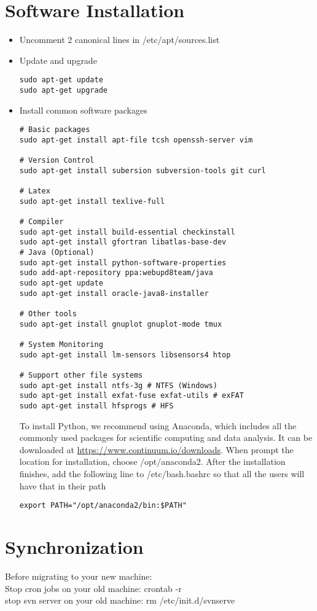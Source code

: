 \documentclass[12pt]{article}
\begin{document}
\section{Software Installation}
\begin{itemize}
\item Uncomment 2 canonical lines in /etc/apt/sources.list
\item Update and upgrade
\begin{Verbatim}
sudo apt-get update
sudo apt-get upgrade
\end{Verbatim}
\item Install common software packages
\begin{Verbatim}
# Basic packages
sudo apt-get install apt-file tcsh openssh-server vim

# Version Control
sudo apt-get install subersion subversion-tools git curl

# Latex
sudo apt-get install texlive-full

# Compiler
sudo apt-get install build-essential checkinstall
sudo apt-get install gfortran libatlas-base-dev
# Java (Optional)
sudo apt-get install python-software-properties
sudo add-apt-repository ppa:webupd8team/java
sudo apt-get update
sudo apt-get install oracle-java8-installer

# Other tools
sudo apt-get install gnuplot gnuplot-mode tmux

# System Monitoring
sudo apt-get install lm-sensors libsensors4 htop

# Support other file systems
sudo apt-get install ntfs-3g # NTFS (Windows)
sudo apt-get install exfat-fuse exfat-utils # exFAT
sudo apt-get install hfsprogs # HFS

\end{Verbatim}

To install Python, we recommend using Anaconda, which includes all the commonly used packages for scientific computing and data analysis.
It can be downloaded at \url{https://www.continuum.io/downloads}.
When prompt the location for installation, choose /opt/anaconda2.
After the installation finishes, add the following line to /etc/bash.bashrc so that all the users will have that in their path
\begin{Verbatim}
export PATH="/opt/anaconda2/bin:$PATH"
\end{Verbatim}

\end{itemize}



\section{Synchronization}
Before migrating to your new machine:\\
Stop cron jobs on your old machine: crontab -r \\
stop svn server on your old machine: rm /etc/init.d/svnserve
\end{document}
